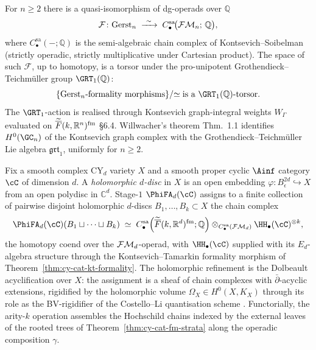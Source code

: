 \begin{theorem}
\label{thm:cy-cat-kt-formality}
For $n \geq 2$ there is a quasi-isomorphism of dg-operads over
$\mathbb{Q}$
\[
 \mathcal{F} \colon
 \mathrm{Gerst}_n \;\xrightarrow{\ \sim\ }\;
 C^{\mathrm{sa}}_\bullet\!\bigl(\mathcal{FM}_n;\, \mathbb{Q}\bigr),
\]
where $C^{\mathrm{sa}}_\bullet(-; \mathbb{Q})$ is the semi-algebraic
chain complex of Kontsevich--Soibelman (strictly operadic, strictly
multiplicative under Cartesian product). The space of such
$\mathcal{F}$, up to homotopy, is a torsor under the pro-unipotent
Grothendieck--Teichm\"uller group $\GRT_1(\mathbb{Q})$:
\[
 \{\Gerst_n\text{-formality morphisms}\}/{\simeq}
 \;\text{is a }\GRT_1(\mathbb{Q})\text{-torsor}.
\]
The $\GRT_1$-action is realised through Kontsevich graph-integral
weights $W_\Gamma$ evaluated on $\widetilde{\overline{F}}(k, \mathbb{R}^n)^{\mathrm{fm}}$
\cite{Kontsevich2003} \S 6.4. Willwacher's theorem
\cite{Willwacher2015} Thm.\ 1.1 identifies
$H^0(\GC_n)$ of the Kontsevich graph complex with the
Grothendieck--Teichm\"uller Lie algebra $\mathfrak{grt}_1$, uniformly
for $n \geq 2$.
\end{theorem}

\begin{construction}
\label{constr:cy-cat-phifa-as-fm-colimit}
Fix a smooth complex CY$_d$ variety $X$ and a smooth proper cyclic
$\Ainf$ category $\cC$ of dimension $d$. A \emph{holomorphic $d$-disc}
in $X$ is an open embedding $\varphi \colon B^{2d}_\epsilon
\hookrightarrow X$ from an open polydisc in $\mathbb{C}^d$. Stage-$1$
$\PhiFA_d(\cC)$ assigns to a finite collection of pairwise disjoint
holomorphic $d$-discs $B_1, \ldots, B_k \subset X$ the chain complex
\[
 \PhiFA_d(\cC)(B_1 \sqcup \cdots \sqcup B_k)
 \;\simeq\;
 C^{\mathrm{sa}}_\bullet\!\left(\widetilde{\FMbar}(k, \mathbb{R}^d)^{\mathrm{fm}}; \mathbb{Q}\right)
 \otimes_{C^{\mathrm{sa}}_\bullet(\FMop_d)}
 \HH_\bullet(\cC)^{\otimes k},
\]
the homotopy coend over the $\mathcal{FM}_d$-operad, with $\HH_\bullet(\cC)$
supplied with its $E_d$-algebra structure through the Kontsevich--Tamarkin
formality morphism of Theorem~\ref{thm:cy-cat-kt-formality}. The
holomorphic refinement is the Dolbeault acyclification over $X$: the
assignment is a sheaf of chain complexes with $\bar\partial$-acyclic
extensions, rigidified by the holomorphic volume $\Omega_X \in
H^0(X, K_X)$ through its role as the BV-rigidifier of the
Costello--Li quantisation scheme
\cite{CostelloLi2016,CostelloLi2020}.
Functorially, the arity-$k$ operation assembles the Hochschild chains
indexed by the external leaves of the rooted trees of
Theorem~\ref{thm:cy-cat-fm-strata} along the operadic composition
$\gamma$.
\end{construction}

